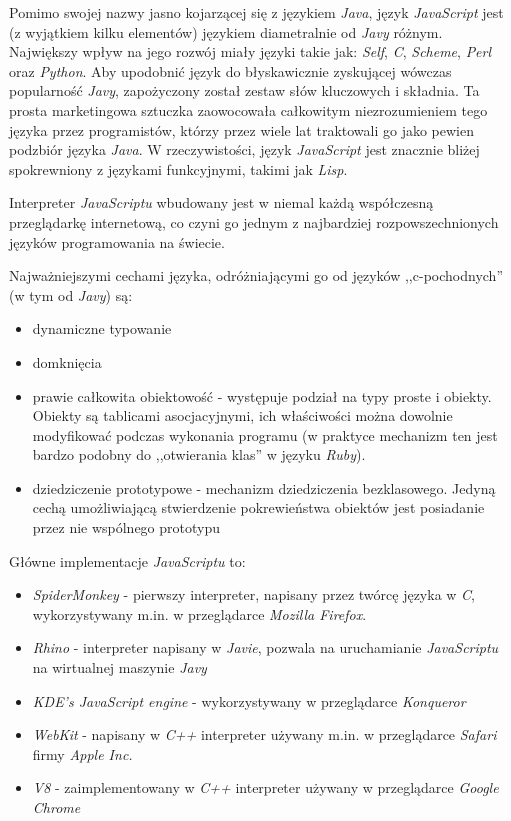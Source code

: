 \documentclass[a4paper,12pt]{article}
\begin{document}
Pomimo swojej nazwy jasno kojarzącej się z językiem \emph{Java}, język
\emph{JavaScript} jest (z wyjątkiem kilku elementów) językiem
diametralnie od \emph{Javy} różnym. Największy wpływ na jego rozwój
miały języki takie jak: \emph{Self}, \emph{C}, \emph{Scheme},
\emph{Perl} oraz \emph{Python}\cite{javascript}. Aby upodobnić język
do błyskawicznie zyskującej wówczas popularność \emph{Javy},
zapożyczony został zestaw słów kluczowych i składnia. Ta prosta
marketingowa sztuczka zaowocowała całkowitym niezrozumieniem tego
języka przez programistów, którzy przez wiele lat traktowali go jako
pewien podzbiór języka \emph{Java}. W rzeczywistości, język
\emph{JavaScript} jest znacznie bliżej spokrewniony z językami
funkcyjnymi, takimi jak \emph{Lisp}.

Interpreter \emph{JavaScriptu} wbudowany jest w niemal każdą
współczesną przeglądarkę internetową, co czyni go jednym z najbardziej
rozpowszechnionych języków programowania na świecie.

Najważniejszymi cechami języka, odróżniającymi go od języków
,,c-pochodnych'' (w tym od \emph{Javy}) są:

\begin{itemize}
\item dynamiczne typowanie
\item domknięcia
\item prawie całkowita obiektowość - występuje podział na typy proste
  i obiekty. Obiekty są tablicami asocjacyjnymi, ich właściwości można
  dowolnie modyfikować podczas wykonania programu (w praktyce
  mechanizm ten jest bardzo podobny do ,,otwierania klas'' w języku
  \emph{Ruby}).
\item dziedziczenie prototypowe - mechanizm dziedziczenia
  bezklasowego. Jedyną cechą umożliwiającą stwierdzenie pokrewieństwa
  obiektów jest posiadanie przez nie wspólnego prototypu
\end{itemize}

Główne implementacje \emph{JavaScriptu} to\cite{javascript}:

\begin{itemize}
\item \emph{SpiderMonkey} - pierwszy interpreter, napisany przez
  twórcę języka w \emph{C}, wykorzystywany m.in. w przeglądarce \emph{Mozilla
    Firefox}.
\item \emph{Rhino} - interpreter napisany w \emph{Javie}, pozwala na
  uruchamianie \emph{JavaScriptu} na wirtualnej maszynie \emph{Javy}
\item \emph{KDE's JavaScript engine} - wykorzystywany w przeglądarce
  \emph{Konqueror}
\item \emph{WebKit} - napisany w \emph{C++} interpreter używany
  m.in. w przeglądarce \emph{Safari} firmy \emph{Apple Inc.}
\item \emph{V8} - zaimplementowany w \emph{C++} interpreter używany w
  przeglądarce \emph{Google Chrome}
\end{itemize}
\end{document}
